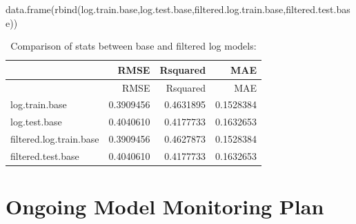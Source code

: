 \documentclass[
  letterpaper,
  DIV=11,
  numbers=noendperiod]{scrartcl}
\newenvironment{Shaded}{\begin{snugshade}}{\end{snugshade}}
\newcommand{\AttributeTok}[1]{\textcolor[rgb]{0.40,0.45,0.13}{#1}}
\newcommand{\CommentTok}[1]{\textcolor[rgb]{0.37,0.37,0.37}{#1}}
\newcommand{\DecValTok}[1]{\textcolor[rgb]{0.68,0.00,0.00}{#1}}
\newcommand{\FunctionTok}[1]{\textcolor[rgb]{0.28,0.35,0.67}{#1}}
\newcommand{\NormalTok}[1]{\textcolor[rgb]{0.00,0.23,0.31}{#1}}
\newcommand{\OtherTok}[1]{\textcolor[rgb]{0.00,0.23,0.31}{#1}}
\newcommand{\SpecialCharTok}[1]{\textcolor[rgb]{0.37,0.37,0.37}{#1}}
\newcommand{\StringTok}[1]{\textcolor[rgb]{0.13,0.47,0.30}{#1}}
\begin{document}
\begin{Shaded}
\end{Shaded}

\begin{Shaded}
\begin{Highlighting}[]
\FunctionTok{data.frame}\NormalTok{(}\FunctionTok{rbind}\NormalTok{(log.train.base,log.test.base,filtered.log.train.base,filtered.test.base))}
\end{Highlighting}
\end{Shaded}

\begin{longtable}[]{@{}lrrr@{}}
\caption{Comparison of stats between base and filtered log
models:}\tabularnewline
\toprule\noalign{}
& RMSE & Rsquared & MAE \\
\midrule\noalign{}
\endfirsthead
\toprule\noalign{}
& RMSE & Rsquared & MAE \\
\midrule\noalign{}
\endhead
\bottomrule\noalign{}
\endlastfoot
log.train.base & 0.3909456 & 0.4631895 & 0.1528384 \\
log.test.base & 0.4040610 & 0.4177733 & 0.1632653 \\
filtered.log.train.base & 0.3909456 & 0.4627873 & 0.1528384 \\
filtered.test.base & 0.4040610 & 0.4177733 & 0.1632653 \\
\end{longtable}

\section{Ongoing Model Monitoring
Plan}\label{ongoing-model-monitoring-plan}
\end{document}
